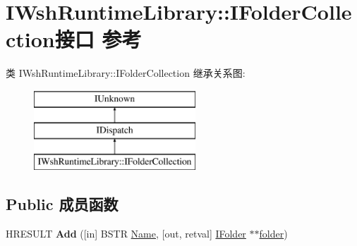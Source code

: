\hypertarget{interface_i_wsh_runtime_library_1_1_i_folder_collection}{}\section{I\+Wsh\+Runtime\+Library\+:\+:I\+Folder\+Collection接口 参考}
\label{interface_i_wsh_runtime_library_1_1_i_folder_collection}
类 I\+Wsh\+Runtime\+Library\+:\+:I\+Folder\+Collection 继承关系图\+:\begin{figure}[H]
\begin{center}
\leavevmode
\includegraphics[height=3.000000cm]{interface_i_wsh_runtime_library_1_1_i_folder_collection}
\end{center}
\end{figure}
\subsection*{Public 成员函数}
\begin{DoxyCompactItemize}
\item 
\mbox{\label{interface_i_wsh_runtime_library_1_1_i_folder_collection_a8926688d03181786cdf1888c75edf260}} 
H\+R\+E\+S\+U\+LT {\bfseries Add} (\mbox{[}in\mbox{]} B\+S\+TR \hyperlink{struct_name_rec__}{Name}, \mbox{[}out, retval\mbox{]} \hyperlink{interface_i_wsh_runtime_library_1_1_i_folder}{I\+Folder} $\ast$$\ast$\hyperlink{structfolder}{folder})
\end{DoxyCompactItemize}
